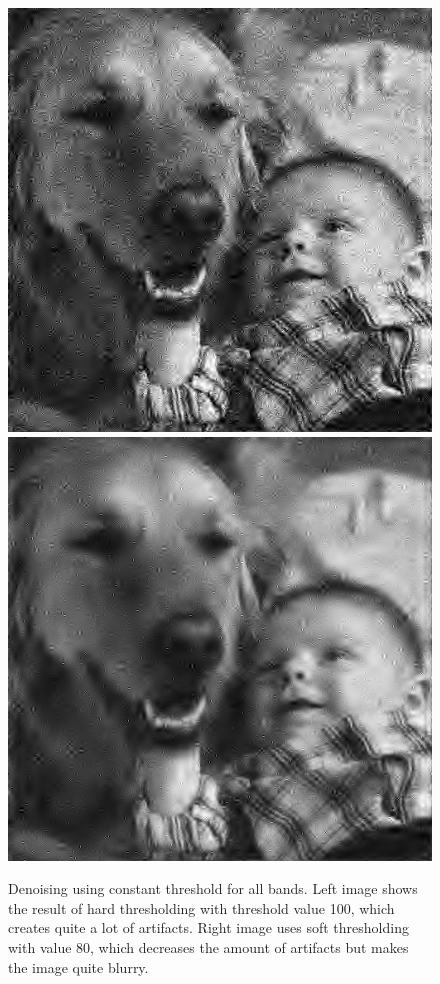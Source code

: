 \documentclass{article}
\begin{document}
\begin{figure}
    \centering
    \includegraphics[scale=0.40]{kd_hard}\includegraphics[scale=0.40]{kd_soft}
    \caption{Denoising using constant threshold for all bands. Left image shows the result of hard thresholding with threshold value 100, which creates quite a lot of artifacts. Right image uses soft thresholding with value 80, which decreases the amount of artifacts but makes the image quite blurry.}\label{fig:constt}
\end{figure}
\end{document}
